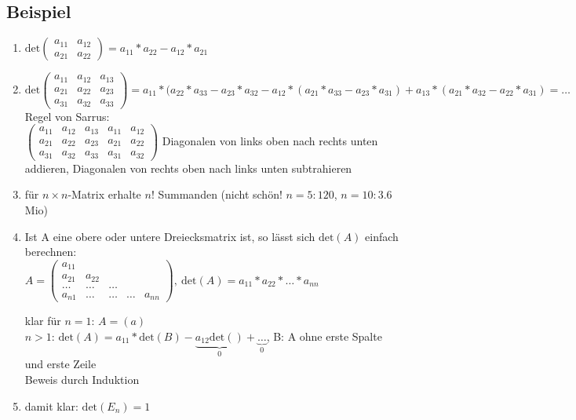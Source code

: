 \subsection{Beispiel}
\begin{enumerate}
	\item
	$\mathrm{det}\begin{pmatrix}a_{11} & a_{12} \\ a_{21} & a_{22}\end{pmatrix}=a_{11}*a_{22}-a_{12}*a_{21}$
	
	\item
	$\mathrm{det}\begin{pmatrix}a_{11} & a_{12} & a_{13} \\ a_{21} & a_{22} & a_{23} \\ a_{31} & a_{32} & a_{33}\end{pmatrix} = a_{11}*(a_{22}*a_{33}-a_{23}*a_{32} -a_{12}*(a_{21}*a_{33}-a_{23}*a_{31}) + a_{13}*(a_{21}*a_{32}-a_{22}*a_{31}) = \dots$\\
	Regel von Sarrus:\\
	$\begin{pmatrix}a_{11} & a_{12} & a_{13} & a_{11} & a_{12}\\ a_{21} & a_{22} & a_{23} & a_{21} & a_{22} \\ a_{31} & a_{32} & a_{33} & a_{31} & a_{32}\end{pmatrix}$ Diagonalen von links oben nach rechts unten addieren, Diagonalen von rechts oben nach links unten subtrahieren
	
	\item
	für $n\times n$-Matrix erhalte $n!$ Summanden (nicht schön! $n=5: 120$, $n=10: 3.6$Mio)
	
	\item
	Ist A eine obere oder untere Dreiecksmatrix ist, so lässt sich $\mathrm{det}(A)$ einfach berechnen:\\
	$A=\begin{pmatrix}a_{11} \\ a_{21} & a_{22} \\ \dots & \dots & \dots \\ a_{n1} & \dots & \dots & \dots & a_{nn}\end{pmatrix}, \ \mathrm{det}(A)=a_{11}*a_{22}*\dots*a_{nn}$
	
	klar für $n=1$: $A=(a)$\\
	$n>1$: $\mathrm{det}(A)= a_{11}*\mathrm{det}(B)-\underbrace{a_{12}\mathrm{det}( )}_{0} +\underbrace{\dots}_{0}$, B: A ohne erste Spalte und erste Zeile\\
	Beweis durch Induktion
	
	\item
	damit klar: $\mathrm{det}(E_n)=1$
\end{enumerate}

